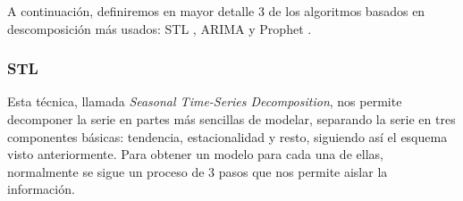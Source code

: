A continuación, definiremos en mayor detalle 3 de los algoritmos basados en descomposición más usados: STL \cite{cleveland1990stl}, ARIMA \cite{box1970time} y Prophet \cite{taylor2018prophet}.

\subsubsection{STL}

Esta técnica, llamada \textit{Seasonal Time-Series Decomposition}, nos permite decomponer la serie en partes más sencillas de modelar, separando la serie en tres componentes básicas: tendencia, estacionalidad y resto, siguiendo así el esquema visto anteriormente. Para obtener un modelo para cada una de ellas,  normalmente se sigue un proceso de 3 pasos que nos permite aislar la información.

